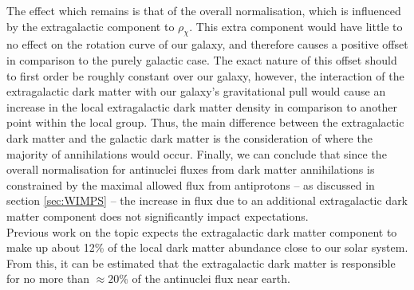 The effect which remains is that of the overall normalisation, which is influenced by the extragalactic component to $\rho_\chi$. This extra component would have little to no effect on the rotation curve of our galaxy, and therefore causes a positive offset in comparison to the purely galactic case. The exact nature of this offset should to first order be roughly constant over our galaxy, however, the interaction of the extragalactic dark matter with our galaxy's gravitational pull would cause an increase in the local extragalactic dark matter density in comparison to another point within the local group. Thus, the main difference between the extragalactic dark matter and the galactic dark matter is the consideration of where the majority of annihilations would occur. Finally, we can conclude that since the overall normalisation for antinuclei fluxes from dark matter annihilations is constrained by the maximal allowed flux from antiprotons -- as discussed in section \ref{sec:WIMPS} -- the increase in flux due to an additional extragalactic dark matter component does not significantly impact expectations. \\

Previous work on the topic expects the extragalactic dark matter component to make up about 12\% of the local dark matter abundance close to our solar system\cite{}. From this, it can be estimated that the extragalactic dark matter is responsible for no more than $\approx20$\% of the antinuclei flux near earth. 

